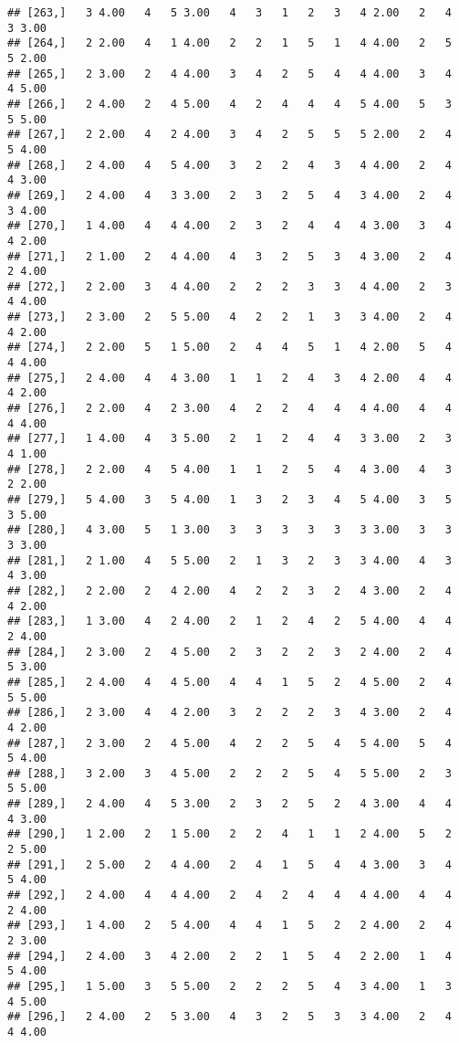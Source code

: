 \documentclass[]{article}
\begin{document}
\begin{verbatim}
## [263,]   3 4.00   4   5 3.00   4   3   1   2   3   4 2.00   2   4   3 3.00
## [264,]   2 2.00   4   1 4.00   2   2   1   5   1   4 4.00   2   5   5 2.00
## [265,]   2 3.00   2   4 4.00   3   4   2   5   4   4 4.00   3   4   4 5.00
## [266,]   2 4.00   2   4 5.00   4   2   4   4   4   5 4.00   5   3   5 5.00
## [267,]   2 2.00   4   2 4.00   3   4   2   5   5   5 2.00   2   4   5 4.00
## [268,]   2 4.00   4   5 4.00   3   2   2   4   3   4 4.00   2   4   4 3.00
## [269,]   2 4.00   4   3 3.00   2   3   2   5   4   3 4.00   2   4   3 4.00
## [270,]   1 4.00   4   4 4.00   2   3   2   4   4   4 3.00   3   4   4 2.00
## [271,]   2 1.00   2   4 4.00   4   3   2   5   3   4 3.00   2   4   2 4.00
## [272,]   2 2.00   3   4 4.00   2   2   2   3   3   4 4.00   2   3   4 4.00
## [273,]   2 3.00   2   5 5.00   4   2   2   1   3   3 4.00   2   4   4 2.00
## [274,]   2 2.00   5   1 5.00   2   4   4   5   1   4 2.00   5   4   4 4.00
## [275,]   2 4.00   4   4 3.00   1   1   2   4   3   4 2.00   4   4   4 2.00
## [276,]   2 2.00   4   2 3.00   4   2   2   4   4   4 4.00   4   4   4 4.00
## [277,]   1 4.00   4   3 5.00   2   1   2   4   4   3 3.00   2   3   4 1.00
## [278,]   2 2.00   4   5 4.00   1   1   2   5   4   4 3.00   4   3   2 2.00
## [279,]   5 4.00   3   5 4.00   1   3   2   3   4   5 4.00   3   5   3 5.00
## [280,]   4 3.00   5   1 3.00   3   3   3   3   3   3 3.00   3   3   3 3.00
## [281,]   2 1.00   4   5 5.00   2   1   3   2   3   3 4.00   4   3   4 3.00
## [282,]   2 2.00   2   4 2.00   4   2   2   3   2   4 3.00   2   4   4 2.00
## [283,]   1 3.00   4   2 4.00   2   1   2   4   2   5 4.00   4   4   2 4.00
## [284,]   2 3.00   2   4 5.00   2   3   2   2   3   2 4.00   2   4   5 3.00
## [285,]   2 4.00   4   4 5.00   4   4   1   5   2   4 5.00   2   4   5 5.00
## [286,]   2 3.00   4   4 2.00   3   2   2   2   3   4 3.00   2   4   4 2.00
## [287,]   2 3.00   2   4 5.00   4   2   2   5   4   5 4.00   5   4   5 4.00
## [288,]   3 2.00   3   4 5.00   2   2   2   5   4   5 5.00   2   3   5 5.00
## [289,]   2 4.00   4   5 3.00   2   3   2   5   2   4 3.00   4   4   4 3.00
## [290,]   1 2.00   2   1 5.00   2   2   4   1   1   2 4.00   5   2   2 5.00
## [291,]   2 5.00   2   4 4.00   2   4   1   5   4   4 3.00   3   4   5 4.00
## [292,]   2 4.00   4   4 4.00   2   4   2   4   4   4 4.00   4   4   2 4.00
## [293,]   1 4.00   2   5 4.00   4   4   1   5   2   2 4.00   2   4   2 3.00
## [294,]   2 4.00   3   4 2.00   2   2   1   5   4   2 2.00   1   4   5 4.00
## [295,]   1 5.00   3   5 5.00   2   2   2   5   4   3 4.00   1   3   4 5.00
## [296,]   2 4.00   2   5 3.00   4   3   2   5   3   3 4.00   2   4   4 4.00

\end{verbatim}
\end{document}
